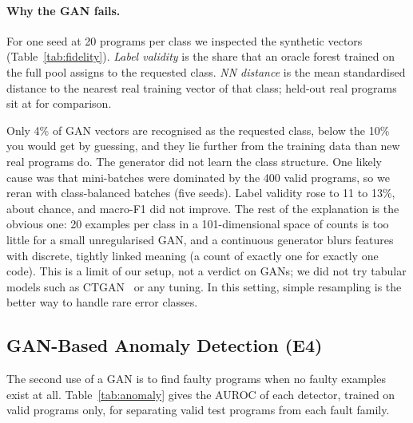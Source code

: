 \paragraph{Why the GAN fails.} For one seed at 20 programs per class we inspected the synthetic vectors
(Table~\ref{tab:fidelity}). \emph{Label validity} is the share that an oracle forest trained on the full pool assigns to
the requested class. \emph{NN distance} is the mean standardised distance to the nearest real training vector of that
class; held-out real programs sit at \HeldoutNN{} for comparison.

\begin{table}[!htbp]
\centering
\caption{Fidelity of synthetic vectors (seed 0, 20 real programs per faulty class). Resampling methods score high on
label validity by construction, since their points sit on or next to real vectors.}
\label{tab:fidelity}
\small

\end{table}

Only 4\% of GAN vectors are recognised as the requested class, below the 10\% you would get by guessing, and they lie
further from the training data than new real programs do. The generator did not learn the class structure. One likely
cause was that mini-batches were dominated by the 400 valid programs, so we reran with class-balanced batches (five
seeds). Label validity rose to 11 to 13\%, about chance, and macro-F1 did not improve. The rest of the explanation is the
obvious one: 20 examples per class in a 101-dimensional space of counts is too little for a small unregularised GAN, and
a continuous generator blurs features with discrete, tightly linked meaning (a count of exactly one for exactly one
code). This is a limit of our setup, not a verdict on GANs; we did not try tabular models such as CTGAN~\cite{xu2019} or
any tuning. In this setting, simple resampling is the better way to handle rare error classes.

\subsection{GAN-Based Anomaly Detection (E4)}

The second use of a GAN is to find faulty programs when no faulty examples exist at all. Table~\ref{tab:anomaly} gives
the AUROC of each detector, trained on valid programs only, for separating valid test programs from each fault family.

\begin{table}[!htbp]
\centering
\caption{AUROC of valid-versus-faulty detection by fault family.}
\label{tab:anomaly}
\small
\resizebox{\textwidth}{!}{}
\end{table}

